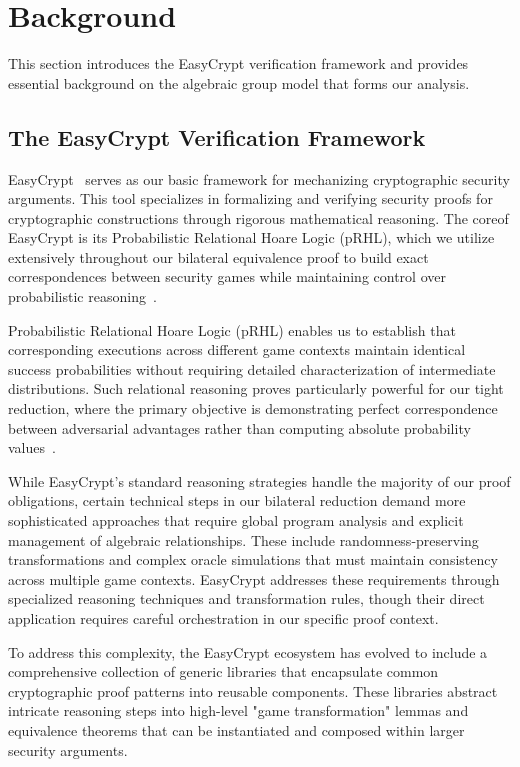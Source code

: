 \chapter{Background}\label{chap:background}



This section introduces the EasyCrypt verification framework and provides essential background on the algebraic group model that forms our analysis.

\section{The EasyCrypt Verification Framework}
\label{sec:easycrypt-framework}

EasyCrypt~\cite{easycrypt} serves as our basic framework for mechanizing cryptographic security arguments. This tool specializes in formalizing and verifying security proofs for cryptographic constructions through rigorous mathematical reasoning. The coreof EasyCrypt is its Probabilistic Relational Hoare Logic (pRHL), which we utilize extensively throughout our bilateral equivalence proof to build exact correspondences between security games while maintaining control over probabilistic reasoning~\cite{Bar2012}.

Probabilistic Relational Hoare Logic (pRHL) enables us to establish that corresponding executions across different game contexts maintain identical success probabilities without requiring detailed characterization of intermediate distributions. Such relational reasoning proves particularly powerful for our tight reduction, where the primary objective is demonstrating perfect correspondence between adversarial advantages rather than computing absolute probability values~\cite{kyber2024}.

While EasyCrypt's standard reasoning strategies handle the majority of our proof obligations, certain technical steps in our bilateral reduction demand more sophisticated approaches that require global program analysis and explicit management of algebraic relationships. These include randomness-preserving transformations and complex oracle simulations that must maintain consistency across multiple game contexts. EasyCrypt addresses these requirements through specialized reasoning techniques and transformation rules, though their direct application requires careful orchestration in our specific proof context.

To address this complexity, the EasyCrypt ecosystem has evolved to include a comprehensive collection of generic libraries that encapsulate common cryptographic proof patterns into reusable components. These libraries abstract intricate reasoning steps into high-level "game transformation" lemmas and equivalence theorems that can be instantiated and composed within larger security arguments.



